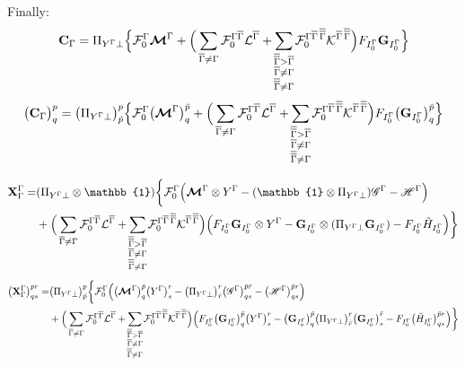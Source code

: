 Finally:
\begin{equation}
  \mathbf{C}_\irp =
  \Pi_{Y^\irp \perp} \Big\{
  \mathcal{F}_0^\irp \matM^\irp
  + \Big(
      \sumB \mathcal{F}_0^{\irp\irpB} \mathcal{L}^\irpB
      + \sumBB \mathcal{F}_0^{\irp\irpB\,\irpBB} \mathcal{K}^{\irpB\,\irpBB}
  \Big) F_{I_0^\irp} \matG_{I_0^\irp}
  \Big\}
\end{equation}
\begin{equation}
  \big( \mathbf{C}_\irp \big)^p_q =
  \big( \Pi_{Y^\irp \perp} \big)^p_{\bar{p}} \Big\{
  \mathcal{F}_0^\irp \big( \matM^\irp \big)^{\bar{p}}_q
  + \Big(
      \sumB \mathcal{F}_0^{\irp\irpB} \mathcal{L}^\irpB
      + \sumBB \mathcal{F}_0^{\irp\irpB\,\irpBB} \mathcal{K}^{\irpB\,\irpBB}
  \Big) F_{I_0^\irp} \big( \matG_{I_0^\irp} \big)^{\bar{p}}_q
  \Big\}
\end{equation}

\begin{equation}
  \begin{split}
    \mathbf{X}_\irp^\irp = &
    (\Pi_{Y^\irp \perp} \otimes \mathbb{1})
    \bigg\{ \mathcal{F}_0^\irp
    \Big(
        \matM^\irp \otimes Y^\irp
        - (\mathbb{1} \otimes \Pi_{Y^\irp \perp}) \bigG^\irp
        - \bigH^\irp
    \Big)\\
    & +
    \Big(
        \sumB \mathcal{F}_0^{\irp\irpB} \mathcal{L}^\irpB
        + \sumBB \mathcal{F}_0^{\irp\irpB\,\irpBB} \mathcal{K}^{\irpB\,\irpBB}
    \Big)
    \Big(
        F_{I_0^\irp} \matG_{I_0^\irp} \otimes Y^\irp
        - \matG_{I_0^\irp} \otimes (\Pi_{Y^\irp \perp} \matG_{I_0^\irp})
        - F_{I_0^\irp} \tilde{H}_{I_0^\irp}
    \Big)
    \bigg\}
  \end{split}
\end{equation}
\begin{equation}
  \begin{split}
    \big( \mathbf{X}_\irp^\irp \big)^{pr}_{qs} = &
    \big( \Pi_{Y^\irp \perp} \big)^p_{\bar{p}} \bigg\{ \mathcal{F}_0^\irp
    \Big(
        \big( \matM^\irp \big)^{\bar{p}}_q \big( Y^\irp \big)^r_s
        - \big( \Pi_{Y^\irp \perp} \big)^r_{\bar{r}} \big( \bigG^\irp \big)^{\bar{p}\bar{r}}_{qs}
        - \big( \bigH^\irp \big)^{\bar{p}r}_{qs}
    \Big)\\
    & +
    \Big(
        \sumB \mathcal{F}_0^{\irp\irpB} \mathcal{L}^\irpB
        + \sumBB \mathcal{F}_0^{\irp\irpB\,\irpBB} \mathcal{K}^{\irpB\,\irpBB}
    \Big)
    \Big(
        F_{I_0^\irp} \big( \matG_{I_0^\irp} \big)^{\bar{p}}_q \big( Y^\irp \big)^r_s
        - \big( \matG_{I_0^\irp} \big)^{\bar{p}}_q
          \big( \Pi_{Y^\irp \perp} \big)^r_{\bar{r}}
          \big( \matG_{I_0^\irp} \big)^{\bar{r}}_s
        - F_{I_0^\irp} \big( \tilde{H}_{I_0^\irp} \big)^{\bar{p}r}_{qs}
    \Big)
    \bigg\}
  \end{split}
\end{equation}

